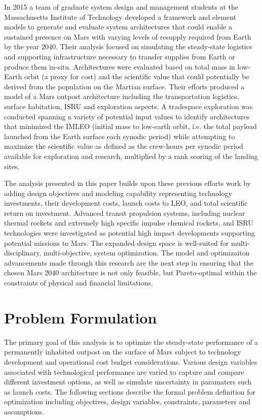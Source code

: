 \documentclass[]{aiaa-pretty}
\begin{document}
In 2015 a team of graduate system design and management students at the Massachusetts Institute of Technology developed a framework and element models to generate and evaluate system architectures that could enable a sustained presence on Mars with varying levels of resupply required from Earth by the year 2040. Their analysis focused on simulating the steady-state logistics and supporting infrastructure necessary to transfer supplies from Earth or produce them in-situ. Architectures were evaluated based on total mass in low-Earth orbit (a proxy for cost) and the scientific value that could potentially be derived from the population on the Martian surface. Their efforts produced a model of a Mars outpost architecture including the transportation logistics, surface habitation, ISRU and exploration aspects. A tradespace exploration was conducted spanning a variety of potential input values to identify architectures that minimized the IMLEO (initial mass to low-earth orbit, i.e. the total payload launched from the Earth surface each synodic period) while attempting to maximize the scientific value as defined as the crew-hours per synodic period available for exploration and research, multiplied by a rank scoring of the landing sites.

The analysis presented in this paper builds upon these previous efforts work by adding design objectives and modeling capability representing technology investments, their development costs, launch costs to LEO, and total scientific return on investment. Advanced transit propulsion systems, including nuclear thermal rockets and extremely high specific impulse chemical rockets, and ISRU technologies were investigated as potential high impact developments supporting potential missions to Mars. The expanded design space is well-suited for multi-disciplinary, multi-objective, system optimization. The model and optimizaiton advancements made through this research are the next step in ensuring that the chosen Mars 2040 architecture is not only feasible, but Pareto-optimal within the constraints of physical and financial limitations. 

\section{Problem Formulation}  
\label{sec:formulation}
The primary goal of this analysis is to optimize the steady-state performance of a permanently inhabited outpost on the surface of Mars subject to technology development and operational cost budget considerations. Various design variables associated with technological performance are varied to capture and compare different investment options, as well as simulate uncertainty in paramaters such as launch costs. The following sections describe the formal problem definition for optimization including objectives, design variables, constraints, parameters and assumptions.
\end{document}
